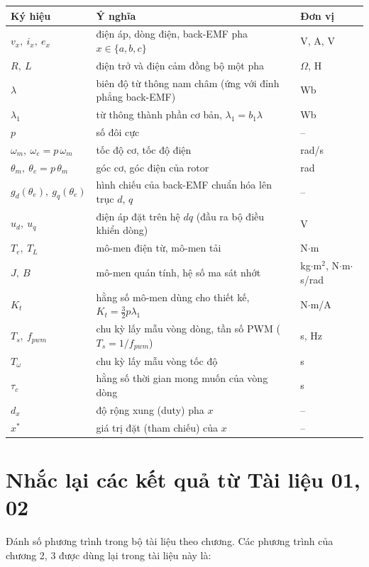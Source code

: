 \documentclass[11pt,a4paper]{article}
\begin{document}
\begin{center}\small
\begin{tabularx}{\linewidth}{@{}l>{\raggedright\arraybackslash}Xl@{}}
\toprule
Ký hiệu & Ý nghĩa & Đơn vị \\ \midrule
$v_x,\ i_x,\ e_x$ & điện áp, dòng điện, back-EMF pha $x\in\{a,b,c\}$ & V, A, V \\
$R,\ L$ & điện trở và điện cảm đồng bộ một pha & $\Omega$, H \\
$\lambda$ & biên độ từ thông nam châm (ứng với đỉnh phẳng back-EMF) & Wb \\
$\lambda_1$ & từ thông thành phần cơ bản, $\lambda_1 = b_1\lambda$ & Wb \\
$p$ & số đôi cực & – \\
$\omega_m,\ \omega_e = p\,\omega_m$ & tốc độ cơ, tốc độ điện & rad/s \\
$\theta_m,\ \theta_e = p\,\theta_m$ & góc cơ, góc điện của rotor & rad \\
$g_d(\theta_e),\ g_q(\theta_e)$ & hình chiếu của back-EMF chuẩn hóa lên trục $d$, $q$ & – \\
$u_d,\ u_q$ & điện áp đặt trên hệ $dq$ (đầu ra bộ điều khiển dòng) & V \\
$T_e,\ T_L$ & mô-men điện từ, mô-men tải & N$\cdot$m \\
$J,\ B$ & mô-men quán tính, hệ số ma sát nhớt & kg$\cdot$m$^2$, N$\cdot$m$\cdot$s/rad \\
$K_t$ & hằng số mô-men dùng cho thiết kế, $K_t = \tfrac32 p\lambda_1$ & N$\cdot$m/A \\
$T_s,\ f_{pwm}$ & chu kỳ lấy mẫu vòng dòng, tần số PWM ($T_s = 1/f_{pwm}$) & s, Hz \\
$T_\omega$ & chu kỳ lấy mẫu vòng tốc độ & s \\
$\tau_c$ & hằng số thời gian mong muốn của vòng dòng & s \\
$d_x$ & độ rộng xung (duty) pha $x$ & – \\
$x^*$ & giá trị đặt (tham chiếu) của $x$ & – \\
\bottomrule
\end{tabularx}
\end{center}

\section*{Nhắc lại các kết quả từ Tài liệu 01, 02}

Đánh số phương trình trong bộ tài liệu theo chương. Các phương trình của chương 2, 3 được dùng lại trong tài liệu này là:
\end{document}
